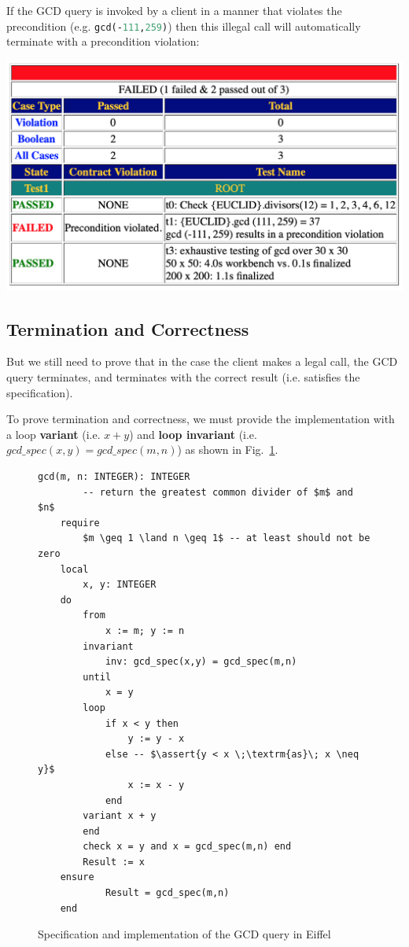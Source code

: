 \documentclass[runningheads,12pt]{article}
\newcommand{\e}[1]{\lstinline[language=eiffel]|#1|}
\def\assert#1{\textcolor{red}{ {\{} {#1} {\}}}}
\begin{document}
If the GCD query is invoked by a client in a manner that violates the precondition (e.g. \e{gcd(-111,259)}) then this illegal call will automatically terminate with a precondition violation:

\includegraphics[width=.8\textwidth]{images/precondition-violate.png}

\subsection{Termination and Correctness} 

But we still need to prove that in the case the client makes a legal call, the GCD query terminates,  and terminates with the correct result (i.e. satisfies the specification).

To prove termination and correctness, we must provide the implementation with a loop \textbf{variant} (i.e. $x +y$) and \textbf{loop invariant} (i.e. $gcd\_spec(x,y) = gcd\_spec(m,n)$) as shown in Fig.~\ref{fig:gcd}.

\begin{figure}[!htb]
\begin{framed}
\caption{Specification and implementation of the GCD query in Eiffel}
\label{fig:gcd}
\lstset{language=eiffel}    
\begin{lstlisting} 
gcd(m, n: INTEGER): INTEGER
		-- return the greatest common divider of $m$ and $n$
	require
		$m \geq 1 \land n \geq 1$ -- at least should not be zero
	local
		x, y: INTEGER
	do
		from
			x := m; y := n
		invariant 
			inv: gcd_spec(x,y) = gcd_spec(m,n)
		until
			x = y
		loop
			if x < y then
				y := y - x
			else -- $\assert{y < x \;\textrm{as}\; x \neq y}$ 
				x := x - y
			end
		variant x + y
		end
		check x = y and x = gcd_spec(m,n) end
		Result := x
	ensure 
			Result = gcd_spec(m,n)
	end
\end{lstlisting} 
\end{framed}
\end{figure}
\end{document}
